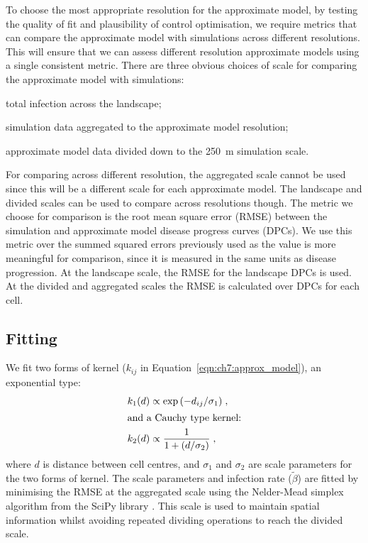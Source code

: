 To choose the most appropriate resolution for the approximate model, by testing the quality of fit and plausibility of control optimisation, we require metrics that can compare the approximate model with simulations across different resolutions. This will ensure that we can assess different resolution approximate models using a single consistent metric. There are three obvious choices of scale for comparing the approximate model with simulations:
\begin{description}
    \setlength{\itemsep}{3pt}%
    \setlength{\parskip}{3pt}%
    \setlength{\parsep}{3pt}%
    \item[Landscape scale:] total infection across the landscape;
    \item[Aggregated scale:] simulation data aggregated to the approximate model resolution;
    \item[Divided scale:] approximate model data divided down to the \SI{250}{\meter} simulation scale.
\end{description}

For comparing across different resolution, the aggregated scale cannot be used since this will be a different scale for each approximate model. The landscape and divided scales can be used to compare across resolutions though. The metric we choose for comparison is the root mean square error (RMSE) between the simulation and approximate model disease progress curves (DPCs). We use this metric over the summed squared errors previously used as the value is more meaningful for comparison, since it is measured in the same units as disease progression. At the landscape scale, the RMSE for the landscape DPCs is used. At the divided and aggregated scales the RMSE is calculated over DPCs for each cell.

\subsection{Fitting}

We fit two forms of kernel ($k_{ij}$ in Equation~\ref{eqn:ch7:approx_model}), an exponential type:
\begin{align}
    k_1(d) &\propto \exp{\left(-d_{ij}/\sigma_1\right)}\;, \\
\intertext{and a Cauchy type kernel:}
    k_2(d) &\propto \frac{1}{1+\left(d/\sigma_2\right)}\;,
\end{align}
where $d$ is distance between cell centres, and $\sigma_1$ and $\sigma_2$ are scale parameters for the two forms of kernel. The scale parameters and infection rate ($\tilde{\beta}$) are fitted by minimising the RMSE at the aggregated scale using the Nelder-Mead simplex algorithm \citep{gao_implementing_2012} from the SciPy library \citep{scipy}. This scale is used to maintain spatial information whilst avoiding repeated dividing operations to reach the divided scale.



